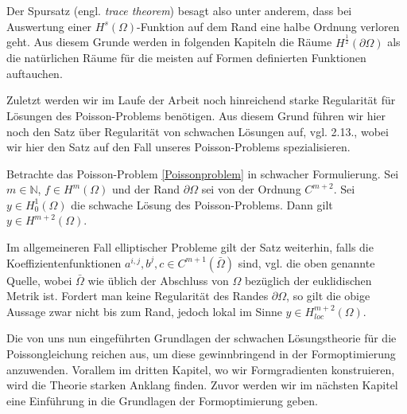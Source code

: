 Der Spursatz (engl. \textit{trace theorem}) besagt also unter anderem, dass bei Auswertung einer $H^{s}(\Omega)$-Funktion auf dem Rand eine halbe Ordnung verloren geht. Aus diesem Grunde werden in folgenden Kapiteln die Räume $H^{\frac{1}{2}}(\partial \Omega)$ als die natürlichen Räume für die meisten auf Formen definierten Funktionen auftauchen.

Zuletzt werden wir im Laufe der Arbeit noch hinreichend starke Regularität für Lösungen des Poisson-Problems benötigen. Aus diesem Grund führen wir hier noch den Satz über Regularität von schwachen Lösungen auf, vgl. \cite{shape_space} 2.13., wobei wir hier den Satz auf den Fall unseres Poisson-Problems spezialisieren.

\begin{theorem}
\label{higherregularity}
	Betrachte das Poisson-Problem \ref{Poissonproblem} in schwacher Formulierung. 
	Sei $m\in\mathbb{N}$, $f\in H^m(\Omega)$ und der Rand $\partial\Omega$ sei von der Ordnung $C^{m+2}$. Sei $y\in H^1_0(\Omega)$ die schwache Lösung des Poisson-Problems. Dann gilt $y\in H^{m+2}(\Omega)$.
\end{theorem}

Im allgemeineren Fall elliptischer Probleme gilt der Satz weiterhin, falls die Koeffizientenfunktionen $a^{i,j}, b^j, c\in C^{m+1}(\bar{\Omega})$ sind, vgl. die oben genannte Quelle, wobei $\bar{\Omega}$ wie üblich der Abschluss von $\Omega$ bezüglich der euklidischen Metrik ist. Fordert man keine Regularität des Randes $\partial\Omega$, so gilt die obige Aussage zwar nicht bis zum Rand, jedoch lokal im Sinne $y\in H^{m+2}_{loc}(\Omega)$. 

Die von uns nun eingeführten Grundlagen der schwachen Lösungstheorie für die Poissongleichung reichen aus, um diese gewinnbringend in der Formoptimierung anzuwenden. Vorallem im dritten Kapitel, wo wir Formgradienten konstruieren, wird die Theorie starken Anklang finden. Zuvor werden wir im nächsten Kapitel eine Einführung in die Grundlagen der Formoptimierung geben.
\newpage

